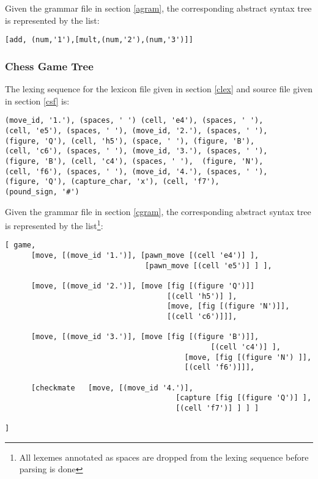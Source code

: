 \documentclass[a4paper,10pt]{article}
\def\st{\noindent}
\begin{document}
Given the grammar file in section \ref{agram}, the corresponding abstract syntax tree is represented by the list:
\begin{verbatim}
[add, (num,'1'),[mult,(num,'2'),(num,'3')]]
\end{verbatim}
\subsubsection{Chess Game Tree}

The lexing sequence for the  lexicon file given in section \ref{clex} and source file given in section \ref{csf} is:

\begin{verbatim}
(move_id, '1.'), (spaces, ' ') (cell, 'e4'), (spaces, ' '), 
(cell, 'e5'), (spaces, ' '), (move_id, '2.'), (spaces, ' '), 
(figure, 'Q'), (cell, 'h5'), (space, ' '), (figure, 'B'),
(cell, 'c6'), (spaces, ' '), (move_id, '3.'), (spaces, ' '), 
(figure, 'B'), (cell, 'c4'), (spaces, ' '),  (figure, 'N'), 
(cell, 'f6'), (spaces, ' '), (move_id, '4.'), (spaces, ' '), 
(figure, 'Q'), (capture_char, 'x'), (cell, 'f7'),  
(pound_sign, '#')
\end{verbatim} 

\st
Given the grammar file in section \ref{cgram}, the corresponding abstract syntax tree  is represented by the list\footnote{All lexemes annotated as spaces are dropped from the lexing sequence before parsing is done}:

\begin{verbatim}
[ game,
      [move, [(move_id '1.')], [pawn_move [(cell 'e4')] ], 
                                [pawn_move [(cell 'e5')] ] ],
       
      [move, [(move_id '2.')], [move [fig [(figure 'Q')]] 
                                     [(cell 'h5')] ], 
                                     [move, [fig [(figure 'N')]], 
                                     [(cell 'c6')]]],
           
      [move, [(move_id '3.')], [move [fig [(figure 'B')]],
                                               [(cell 'c4')] ], 
                                         [move, [fig [(figure 'N') ]], 
                                         [(cell 'f6')]]],
               
      [checkmate   [move, [(move_id '4.')],
                                       [capture [fig [(figure 'Q')] ], 
                                       [(cell 'f7')] ] ] ]
               
]
\end{verbatim}



   


\end{document}
